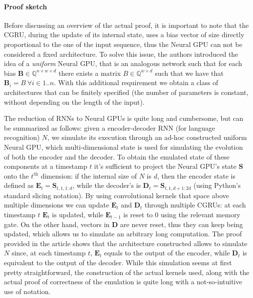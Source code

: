 \documentclass{article}
\begin{document}
\paragraph{Proof sketch}

Before discussing an overview of the actual proof, it is important to note that the CGRU, during the update of its internal state, uses a bias vector of size directly proportional to the one of the input sequence, thus the Neural GPU can not be considered a fixed architecture. To solve this issue, the authors introduced the idea of a \textit{uniform} Neural GPU, that is an analogous network such that for each bias $\mathbf{B} \in \mathbb{Q}^{n \times w \times d}$ there exists a matrix $B \in \mathbb{Q}^{w \times d}$ such that we have that $\mathbf{B}_i = B\ \forall i \in {1..n}$. With this additional requirement we obtain a class of architectures that can be finitely specified (the number of parameters is constant, without depending on the length of the input).

The reduction of RNNs to Neural GPUs is quite long and cumbersome, but can be summarized as follows: given a encoder-decoder RNN (for language recognition) $N$, we simulate its execution through an ad-hoc constructed uniform Neural GPU, which multi-dimensional state is used for simulating the evolution of both the encoder and the decoder. To obtain the emulated state of these components at a timestamp $t$ it's sufficient to project the Neural GPU's state $\mathbf{S}$ onto the $t^{\textrm{th}}$ dimension: if the internal size of $N$ is $d$, then the encoder state is defined as $\mathbf{E}_t = \mathbf{S}_{t,1,1:d}$, while the decoder's is $\mathbf{D}_t = \mathbf{S}_{t,1,d+1:2d}$ (using Python's standard slicing notation). By using convolutional kernels that space above multiple dimensions we can update $\mathbf{E}_t$ and $\mathbf{D}_t$ through multiple CGRUs: at each timestamp $t$ $\mathbf{E}_t$ is updated, while $\mathbf{E}_{t-1}$ is reset to $0$ using the relevant memory gate. On the other hand, vectors in $\mathbf{D}$ are never reset, thus they can keep being updated, which allows us to simulate an arbitrary long computation. The proof provided in the article shows that the architecture constructed allows to simulate $N$ since, at each timestamp $t$, $\mathbf{E}_t$ equals to the output of the encoder, while $\mathbf{D}_t$ is equivalent to the output of the decoder. While this simulation seems at first pretty straightforward, the construction of the actual kernels used, along with the actual proof of correctness of the emulation is quite long with a not-so-intuitive use of notation.
\end{document}
